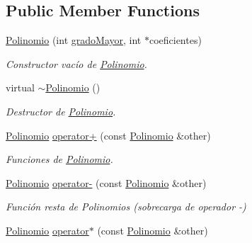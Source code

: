 \subsection*{Public Member Functions}
\begin{DoxyCompactItemize}
\item 
\hyperlink{class_polinomio_a952907e68bab3276d0688dde766c26b1}{Polinomio} (int \hyperlink{class_polinomio_a42b14d0901152a448b86808fd438382b}{grado\+Mayor}, int $\ast$coeficientes)
\begin{DoxyCompactList}\small\item\em Constructor vacío de \hyperlink{class_polinomio}{Polinomio}. \end{DoxyCompactList}\item 
\hypertarget{class_polinomio_a1023ada36c95fce6698316a632fdcc1c}{virtual \hyperlink{class_polinomio_a1023ada36c95fce6698316a632fdcc1c}{$\sim$\+Polinomio} ()}\label{class_polinomio_a1023ada36c95fce6698316a632fdcc1c}

\begin{DoxyCompactList}\small\item\em Destructor de \hyperlink{class_polinomio}{Polinomio}. \end{DoxyCompactList}\item 
\hyperlink{class_polinomio}{Polinomio} \hyperlink{class_polinomio_ac6cdcb7a9b33ad0f4c7fed22bc665afa}{operator+} (const \hyperlink{class_polinomio}{Polinomio} \&other)
\begin{DoxyCompactList}\small\item\em Funciones de \hyperlink{class_polinomio}{Polinomio}. \end{DoxyCompactList}\item 
\hypertarget{class_polinomio_a83f1bb909fa1adfdba0325e693bc0e6a}{\hyperlink{class_polinomio}{Polinomio} \hyperlink{class_polinomio_a83f1bb909fa1adfdba0325e693bc0e6a}{operator-\/} (const \hyperlink{class_polinomio}{Polinomio} \&other)}\label{class_polinomio_a83f1bb909fa1adfdba0325e693bc0e6a}

\begin{DoxyCompactList}\small\item\em Función resta de Polinomios (sobrecarga de operador -\/) \end{DoxyCompactList}\item 
\hypertarget{class_polinomio_a3a604e2ef650894fb3cdc2b215f512b7}{\hyperlink{class_polinomio}{Polinomio} \hyperlink{class_polinomio_a3a604e2ef650894fb3cdc2b215f512b7}{operator$\ast$} (const \hyperlink{class_polinomio}{Polinomio} \&other)}\label{class_polinomio_a3a604e2ef650894fb3cdc2b215f512b7}


\end{DoxyCompactItemize}
